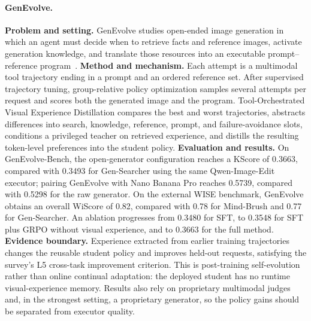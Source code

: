 \paragraph{GenEvolve.}
\textbf{Problem and setting.} GenEvolve studies open-ended image generation in which an agent must decide when to retrieve facts and reference images, activate generation knowledge, and translate those resources into an executable prompt--reference program~\cite{chen2026genevolve}. \textbf{Method and mechanism.} Each attempt is a multimodal tool trajectory ending in a prompt and an ordered reference set. After supervised trajectory tuning, group-relative policy optimization samples several attempts per request and scores both the generated image and the program. Tool-Orchestrated Visual Experience Distillation compares the best and worst trajectories, abstracts differences into search, knowledge, reference, prompt, and failure-avoidance slots, conditions a privileged teacher on retrieved experience, and distills the resulting token-level preferences into the student policy. \textbf{Evaluation and results.} On GenEvolve-Bench, the open-generator configuration reaches a KScore of 0.3663, compared with 0.3493 for Gen-Searcher using the same Qwen-Image-Edit executor; pairing GenEvolve with Nano Banana Pro reaches 0.5739, compared with 0.5298 for the raw generator. On the external WISE benchmark, GenEvolve obtains an overall WiScore of 0.82, compared with 0.78 for Mind-Brush and 0.77 for Gen-Searcher. An ablation progresses from 0.3480 for SFT, to 0.3548 for SFT plus GRPO without visual experience, and to 0.3663 for the full method. \textbf{Evidence boundary.} Experience extracted from earlier training trajectories changes the reusable student policy and improves held-out requests, satisfying the survey's L5 cross-task improvement criterion. This is post-training self-evolution rather than online continual adaptation: the deployed student has no runtime visual-experience memory. Results also rely on proprietary multimodal judges and, in the strongest setting, a proprietary generator, so the policy gains should be separated from executor quality.

